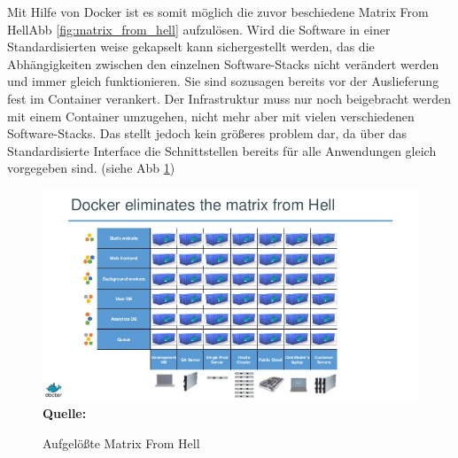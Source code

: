 Mit Hilfe von Docker ist es somit möglich die zuvor beschiedene \glqq Matrix From Hell\grqq Abb \ref{fig:matrix_from_hell} aufzulösen. Wird die Software in einer Standardisierten weise gekapselt kann sichergestellt werden, das die Abhängigkeiten zwischen den einzelnen Software-Stacks nicht verändert werden und immer gleich funktionieren. Sie sind sozusagen bereits vor der Auslieferung fest im Container verankert. Der Infrastruktur muss nur noch beigebracht werden mit einem Container umzugehen, nicht mehr aber mit vielen verschiedenen Software-Stacks. Das stellt jedoch kein größeres problem dar, da über das Standardisierte Interface die Schnittstellen bereits für alle Anwendungen gleich vorgegeben sind. (siehe Abb \ref{fig:aufgeloesste_matrix_from_hell})
\begin{figure}[htbp]
  \centering  
  \includegraphics[scale=0.7]{img/aufgeloesste_matrix_from_hell.jpg}\\
  \footnotesize\sffamily\textbf{Quelle:} \cite{hykes_docker_2013}
  \caption{Aufgelößte Matrix From Hell}
  \label{fig:aufgeloesste_matrix_from_hell}
\end{figure}

